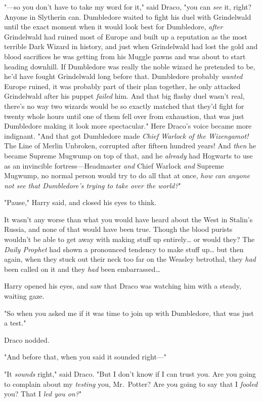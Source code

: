 "---so you don't have to take my word for it," said Draco, "you can \emph{see} 
it, right? Anyone in Slytherin can. Dumbledore waited to fight his duel with 
Grindelwald until the exact moment when it would look best for Dumbledore, 
\emph{after} Grindelwald had ruined most of Europe and built up a reputation as 
the most terrible Dark Wizard in history, and just when Grindelwald had lost 
the gold and blood sacrifices he was getting from his Muggle pawns and was 
about to start heading downhill. If Dumbledore was really the noble wizard he 
pretended to be, he'd have fought Grindelwald long before that. Dumbledore 
probably \emph{wanted} Europe ruined, it was probably part of their plan 
together, he only attacked Grindelwald after his puppet \emph{failed} him. And 
that big flashy duel wasn't real, there's no way two wizards would be so 
exactly matched that they'd fight for twenty whole hours until one of them fell 
over from exhaustion, that was just Dumbledore making it look more 
spectacular." Here Draco's voice became more indignant. "And that got 
Dumbledore made \emph{Chief Warlock of the Wizengamot!} The Line of Merlin 
Unbroken, corrupted after fifteen hundred years! And \emph{then} he became 
Supreme Mugwump on top of that, and he \emph{already} had Hogwarts to use as an 
invincible fortress---Headmaster \emph{and} Chief Warlock \emph{and} Supreme 
Mugwump, no normal person would try to do all that at once, \emph{how can 
anyone not see that Dumbledore's trying to take over the world?}"

"Pause," Harry said, and closed his eyes to think.

It wasn't any worse than what you would have heard about the West in Stalin's 
Russia, and none of that would have been true. Though the blood purists 
wouldn't be able to get away with making stuff up entirely{\ldots} or would 
they? The \emph{Daily Prophet} had shown a pronounced tendency to make stuff 
up{\ldots} but then again, when they stuck out their neck too far on the 
Weasley betrothal, they \emph{had} been called on it and they \emph{had} been 
embarrassed{\ldots}

Harry opened his eyes, and saw that Draco was watching him with a steady, 
waiting gaze.

"So when you asked me if it was time to join up with Dumbledore, that was just 
a test."

Draco nodded.

"And before that, when you said it sounded right---"

"It \emph{sounds} right," said Draco. "But I don't know if I can trust you. Are 
you going to complain about my \emph{testing} you, Mr.~Potter? Are you going to 
say that I \emph{fooled} you? That I \emph{led you on?}"

